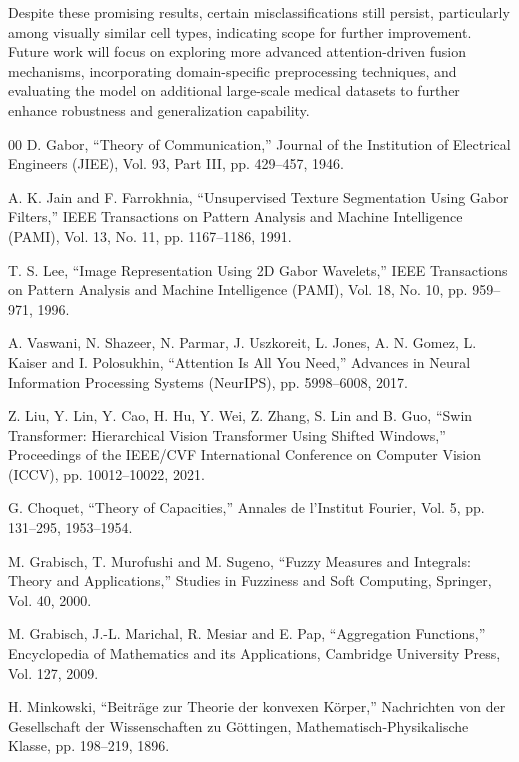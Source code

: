\documentclass[preprint,12pt]{elsarticle}
\begin{document}
Despite these promising results, certain misclassifications still persist, particularly among visually similar cell types, indicating scope for further improvement. Future work will focus on exploring more advanced attention-driven fusion mechanisms, incorporating domain-specific preprocessing techniques, and evaluating the model on additional large-scale medical datasets to further enhance robustness and generalization capability.

\FloatBarrier
\begin{thebibliography}{00}
D. Gabor,
``Theory of Communication,''
Journal of the Institution of Electrical Engineers (JIEE), Vol. 93, Part III, pp. 429--457, 1946.

A. K. Jain and F. Farrokhnia,
``Unsupervised Texture Segmentation Using Gabor Filters,''
IEEE Transactions on Pattern Analysis and Machine Intelligence (PAMI),
Vol. 13, No. 11, pp. 1167--1186, 1991.

T. S. Lee,
``Image Representation Using 2D Gabor Wavelets,''
IEEE Transactions on Pattern Analysis and Machine Intelligence (PAMI),
Vol. 18, No. 10, pp. 959--971, 1996.

A. Vaswani, N. Shazeer, N. Parmar, J. Uszkoreit, L. Jones, A. N. Gomez, 
L. Kaiser and I. Polosukhin,
``Attention Is All You Need,''
Advances in Neural Information Processing Systems (NeurIPS),
pp. 5998--6008, 2017.

Z. Liu, Y. Lin, Y. Cao, H. Hu, Y. Wei, Z. Zhang, S. Lin and B. Guo,
``Swin Transformer: Hierarchical Vision Transformer Using Shifted Windows,''
Proceedings of the IEEE/CVF International Conference on Computer Vision (ICCV),
pp. 10012--10022, 2021.

G. Choquet,
``Theory of Capacities,''
Annales de l’Institut Fourier,
Vol. 5, pp. 131--295, 1953--1954.

M. Grabisch, T. Murofushi and M. Sugeno,
``Fuzzy Measures and Integrals: Theory and Applications,''
Studies in Fuzziness and Soft Computing, Springer,
Vol. 40, 2000.

M. Grabisch, J.-L. Marichal, R. Mesiar and E. Pap,
``Aggregation Functions,''
Encyclopedia of Mathematics and its Applications, Cambridge University Press,
Vol. 127, 2009.

H. Minkowski,
``Beiträge zur Theorie der konvexen Körper,''
Nachrichten von der Gesellschaft der Wissenschaften zu Göttingen, 
Mathematisch-Physikalische Klasse, pp. 198--219, 1896.


\end{thebibliography}
\end{document}
